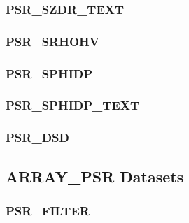 \documentclass[a4paper,11pt,pdftex,twoside]{scrartcl}
\begin{document}
{{{\subsubsection{PSR\_SZDR\_TEXT}
\label{subsec_psr_szdr_text}

\subsubsection{PSR\_SRHOHV}
\label{subsec_psr_srhohv}

\subsubsection{PSR\_SPHIDP}
\label{subsec_psr_sphidp}

\subsubsection{PSR\_SPHIDP\_TEXT}
\label{subsec_psr_sphidp_text}

\subsubsection{PSR\_DSD}
\label{subsec_psr_dsd}

\subsection{ARRAY\_PSR Datasets}

\subsubsection{PSR\_FILTER}
\label{subsec_psr_filter}

}}}
\end{document}
